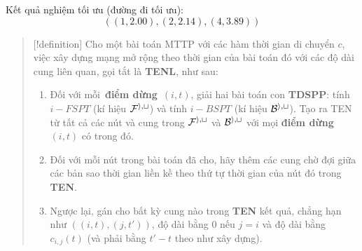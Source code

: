 \documentclass[14pt,oneside]{scrbook}
\providecommand{\tightlist}{\setlength{\itemsep}{\smallskipamount}\setlength{\parskip}{0pt}}
\begin{document}
Kết quả nghiệm tối ưu (đường đi tối ưu):
\[((1, 2.00), (2, 2.14), (4, 3.89))\]

\begin{quote}
{[}!definition{]} Cho một bài toán MTTP với các hàm thời gian di chuyển
\(c\), việc xây dựng mạng mở rộng theo thời gian của bài toán đó với các
độ dài cung liên quan, gọi tắt là \textbf{TENL}, như sau:

\begin{enumerate}
\def\labelenumi{\arabic{enumi}.}
\tightlist
\item
  Đối với mỗi~\textbf{điểm dừng}~\((i, t)\), giải hai bài toán con
  \textbf{TDSPP}: tính \(i-FSPT\) (kí hiệu \(\cal F^{i,t}\)) và tính
  \(i-BSPT\) (kí hiệu \(\cal B^{i,t}\)). Tạo ra TEN từ tất cả các nút và
  cung trong \(\cal F^{i,t}\) và \(\cal B^{i,t}\) với mọi \textbf{điểm
  dừng}~\((i,t)\) có trong đó.
\item
  Đối với mỗi nút trong bài toán đã cho, hãy thêm các cung chờ đợi giữa
  các bản sao thời gian liền kề theo thứ tự thời gian của nút đó trong
  \textbf{TEN}.
\item
  Ngược lại, gán cho bất kỳ cung nào trong \textbf{TEN} kết quả, chẳng
  hạn như \(((i, t), (j, t' ))\), độ dài bằng \(0\) nếu \(j = i\) và độ
  dài bằng \(c_{i,j} (t)\) (và phải bằng \(t' − t\) theo như xây dựng).
\end{enumerate}
\end{quote}
\backmatter
\end{document}
